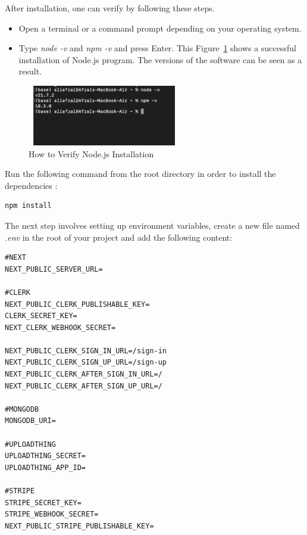 After installation, one can verify by following these steps.

\begin{itemize}
	\item Open a terminal or a command prompt depending on your operating system.
	\item Type \textit{node -v} and \textit{npm -v} and press Enter. This Figure~\ref{fig:terminal-1} shows a successful
installation of Node.js program. The versions of the software can be seen as a
result.
\end{itemize}



\begin{figure}[H]
	\centering
	\includegraphics[width=0.6\textwidth,height=100px,frame]{images/terminal1.eps}
	\caption{How to Verify Node.js Installation}
        \label{fig:terminal-1}
\end{figure}


Run the following command from the root directory in order to  install the dependencies :

\begin{lstlisting}
npm install
\end{lstlisting}


The next step involves setting up environment variables, create a new file named \textit{.env} in the root of your project and add the following content:
\begin{lstlisting}
#NEXT
NEXT_PUBLIC_SERVER_URL=

#CLERK
NEXT_PUBLIC_CLERK_PUBLISHABLE_KEY=
CLERK_SECRET_KEY=
NEXT_CLERK_WEBHOOK_SECRET=

NEXT_PUBLIC_CLERK_SIGN_IN_URL=/sign-in
NEXT_PUBLIC_CLERK_SIGN_UP_URL=/sign-up
NEXT_PUBLIC_CLERK_AFTER_SIGN_IN_URL=/
NEXT_PUBLIC_CLERK_AFTER_SIGN_UP_URL=/

#MONGODB
MONGODB_URI=

#UPLOADTHING
UPLOADTHING_SECRET=
UPLOADTHING_APP_ID=

#STRIPE
STRIPE_SECRET_KEY=
STRIPE_WEBHOOK_SECRET=
NEXT_PUBLIC_STRIPE_PUBLISHABLE_KEY=
\end{lstlisting}

